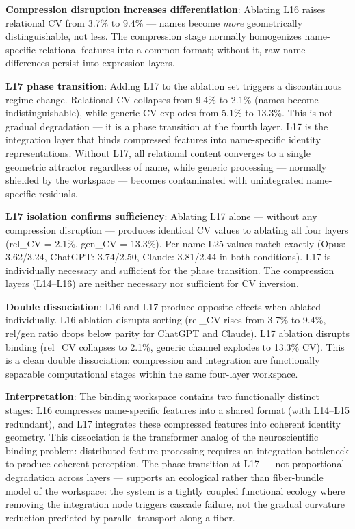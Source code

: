 \documentclass[11pt]{article}
\begin{document}
\textbf{Compression disruption increases differentiation}: Ablating L16 raises relational CV from 3.7\% to 9.4\% --- names become \textit{more} geometrically distinguishable, not less. The compression stage normally homogenizes name-specific relational features into a common format; without it, raw name differences persist into expression layers.

\textbf{L17 phase transition}: Adding L17 to the ablation set triggers a discontinuous regime change. Relational CV collapses from 9.4\% to 2.1\% (names become indistinguishable), while generic CV explodes from 5.1\% to 13.3\%. This is not gradual degradation --- it is a phase transition at the fourth layer. L17 is the integration layer that binds compressed features into name-specific identity representations. Without L17, all relational content converges to a single geometric attractor regardless of name, while generic processing --- normally shielded by the workspace --- becomes contaminated with unintegrated name-specific residuals.

\textbf{L17 isolation confirms sufficiency}: Ablating L17 alone --- without any compression disruption --- produces identical CV values to ablating all four layers (rel\_CV = 2.1\%, gen\_CV = 13.3\%). Per-name L25 values match exactly (Opus: 3.62/3.24, ChatGPT: 3.74/2.50, Claude: 3.81/2.44 in both conditions). L17 is individually necessary and sufficient for the phase transition. The compression layers (L14–L16) are neither necessary nor sufficient for CV inversion.

\textbf{Double dissociation}: L16 and L17 produce opposite effects when ablated individually. L16 ablation disrupts sorting (rel\_CV rises from 3.7\% to 9.4\%, rel/gen ratio drops below parity for ChatGPT and Claude). L17 ablation disrupts binding (rel\_CV collapses to 2.1\%, generic channel explodes to 13.3\% CV). This is a clean double dissociation: compression and integration are functionally separable computational stages within the same four-layer workspace.

\textbf{Interpretation}: The binding workspace contains two functionally distinct stages: L16 compresses name-specific features into a shared format (with L14–L15 redundant), and L17 integrates these compressed features into coherent identity geometry. This dissociation is the transformer analog of the neuroscientific binding problem: distributed feature processing requires an integration bottleneck to produce coherent perception. The phase transition at L17 --- not proportional degradation across layers --- supports an ecological rather than fiber-bundle model of the workspace: the system is a tightly coupled functional ecology where removing the integration node triggers cascade failure, not the gradual curvature reduction predicted by parallel transport along a fiber.
\end{document}
